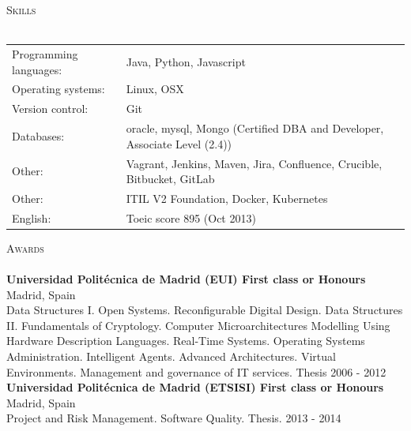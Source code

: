 \documentclass[a4paper]{article}
\newcommand{\lineunder} {
    \vspace*{-8pt} \\
    \hspace*{-18pt} \hrulefill \\
}
\newcommand{\header} [1] {
    {\hspace*{-18pt}\vspace*{6pt} \textsc{#1}}
    \vspace*{-6pt} \lineunder
}
\begin{document}
\header{Skills}
\begin{tabular}{ l l }
	Programming languages: & Java, Python, Javascript                                                  \\
	Operating systems:     & Linux, OSX                                                                \\
	Version control:       & Git                                                                       \\
	Databases:             & oracle, mysql, Mongo (Certified DBA and Developer, Associate Level (2.4)) \\
	Other:                 & Vagrant, Jenkins, Maven, Jira, Confluence, Crucible, Bitbucket, GitLab    \\
	Other:                 & ITIL V2 Foundation, Docker, Kubernetes                                    \\
	English:               & Toeic score 895 (Oct 2013)                                                \\
\end{tabular}

\vspace*{2mm}

\vspace*{2mm}

\header{Awards}
\textbf{Universidad Polit\'ecnica de Madrid (EUI) First class or Honours} \hfill Madrid, Spain\\
Data Structures I. Open Systems. Reconfigurable Digital Design. Data Structures II. Fundamentals of Cryptology. Computer Microarchitectures Modelling Using Hardware Description Languages. Real-Time Systems. Operating Systems Administration. Intelligent Agents. Advanced Architectures. Virtual Environments. Management and governance of IT services. Thesis \hfill 2006 - 2012\\
\vspace*{2mm}
\textbf{Universidad Polit\'ecnica de Madrid (ETSISI) First class or Honours} \hfill Madrid, Spain\\
Project and Risk Management. Software Quality. Thesis. \hfill 2013 - 2014\\
\vspace*{2mm}

\ 
\end{document}
